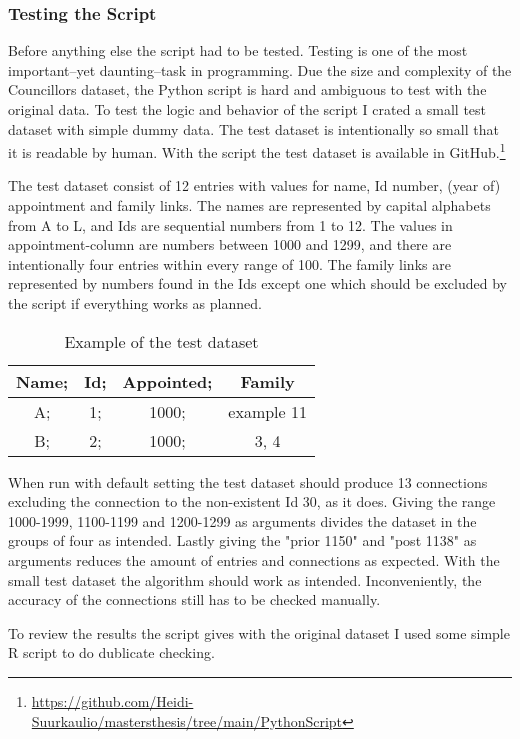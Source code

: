 \subsubsection{Testing the Script}
Before anything else the script had to be tested. Testing is one of the most important–yet daunting–task in programming. Due the size and complexity of the Councillors dataset, the Python script is hard and ambiguous to test with the original data. To test the logic and behavior of the script I crated a small test dataset with simple dummy data. The test dataset is intentionally so small that it is readable by human. With the script the test dataset is available in GitHub.\footnote{\url{https://github.com/Heidi-Suurkaulio/mastersthesis/tree/main/PythonScript}} 

The test dataset consist of 12 entries with values for name, Id number, (year of) appointment and family links. The names are represented by capital alphabets from A to L, and Ids are sequential numbers from 1 to 12. The values in appointment-column are numbers between 1000 and 1299, and there are intentionally four entries within every range of 100. The family links are represented by numbers found in the Ids except one which should be excluded by the script if everything works as planned. 

\begin{table}
	\caption{Example of the test dataset}
	\centering
	\begin{tabular}{cccc}	
		\hline
		Name; &Id; &Appointed; &Family\\
		\hline
		A; &1; &1000; &example 11\\
		\hline
		B; &2; &1000; &3, 4\\
		\hline
	\end{tabular}
\end{table}

When run with default setting the test dataset should produce 13 connections excluding the connection to the non-existent Id 30, as it does. Giving the range 1000-1999, 1100-1199 and 1200-1299 as arguments divides the dataset in the groups of four as intended. Lastly giving the "prior 1150" and "post 1138" as arguments reduces the amount of entries and connections as expected. With the small test dataset the algorithm should work as intended. Inconveniently, the accuracy of the connections still has to be checked manually. 

To review the results the script gives with the original dataset I used some simple R script to do dublicate checking.